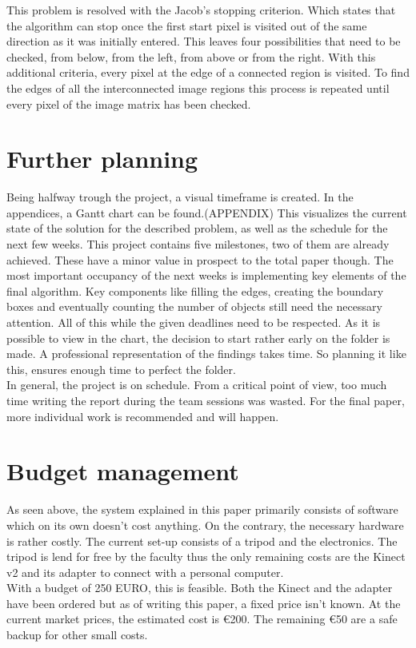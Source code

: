 \documentclass[11pt]{article}
\begin{document}
This problem is resolved with the Jacob's stopping criterion. Which states that the algorithm can stop once the first start pixel is visited out of the same direction as it was initially entered. This leaves four possibilities that need to be checked, from below, from the left, from above or from the right. With this additional criteria, every pixel at the edge of a connected region is visited. 
To find the edges of all the interconnected image regions this process is repeated until every pixel of the image matrix has been checked. 

\section{Further planning}

Being halfway trough the project, a visual timeframe is created. In the appendices, a Gantt chart can be found.(APPENDIX) 
This visualizes the current state of the solution for the described problem, as well as the schedule for the next few weeks. 
This project contains five milestones, two of them are already achieved. These have a minor value in prospect to the total paper though. The most important occupancy of the next weeks is implementing key elements of the final algorithm. Key components like filling the edges, creating the boundary boxes and eventually counting the number of objects still need the necessary attention. All of this while the given deadlines need to be respected. As it is possible to view in the chart, the decision to start rather early on the folder is made. A professional representation of the findings takes time. So planning it like this, ensures enough time to perfect the folder. \\
In general, the project is on schedule. From a critical point of view, too much time writing the report during the team sessions was wasted. For the final paper, more individual work is recommended and will happen.

\section{Budget management}

As seen above, the system explained in this paper primarily consists of software which on its own doesn't cost anything. On the contrary, the necessary hardware is rather costly. The current set-up consists of a tripod and the electronics. The tripod is lend for free by the faculty thus the only remaining costs are the Kinect v2 and its adapter to connect with a personal computer.\\
With a budget of 250 EURO, this is feasible. Both the Kinect and the adapter have been ordered but as of writing this paper, a fixed price isn't known. At the current market prices, the estimated cost is \euro 200. The remaining \euro 50 are a safe backup for other small costs.
\end{document}
